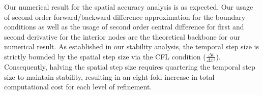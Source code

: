 \quad Our numerical result for the spatial accuracy analysis is as expected. Our usage of second order forward/backward difference approximation for the boundary conditions as well as the usage of second order central difference for first and second derivative for the interior nodes are the theoretical backbone for our numerical result. As established in our stability analysis, the temporal step size is strictly bounded by the spatial step size via the CFL condition ($\frac{\Delta t }{ \Delta x^2}$). Consequently, halving the spatial step size requires quartering the temporal step size to maintain stability, resulting in an eight-fold increase in total computational cost for each level of refinement.


